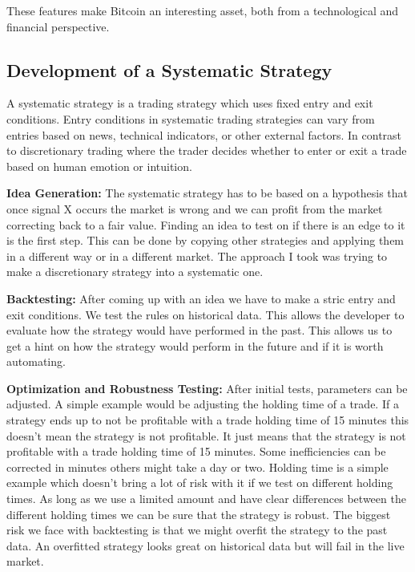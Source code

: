\documentclass[12pt]{article}
\begin{document}
These features make Bitcoin an interesting asset, both from a technological and financial perspective.









\newpage




\subsection*{Development of a Systematic Strategy}


A systematic strategy is a trading strategy which uses fixed entry and exit conditions. Entry conditions in systematic trading strategies can vary from entries based on news, technical indicators, or other external factors. In contrast to discretionary trading where the trader decides whether to enter or exit a trade based on human emotion or intuition.

\textbf{Idea Generation:}
The systematic strategy has to be based on a hypothesis that once signal X occurs the market is wrong and we can profit from the market correcting back to a fair value. Finding an idea to test on if there is an edge to it is the first step. This can be done by copying other strategies and applying them in a different way or in a different market. The approach I took was trying to make a discretionary strategy into a systematic one.



\textbf{Backtesting:}
After coming up with an idea we have to make a stric entry and exit conditions. We test the rules on historical data. This allows the developer to evaluate how the strategy would have performed in the past. This allows us to get a hint on how the strategy would perform in the future and if it is worth automating. 

\textbf{Optimization and Robustness Testing:}
After initial tests, parameters can be adjusted. A simple example would be adjusting the holding time of a trade. If a strategy ends up to not be profitable with a trade holding time of 15 minutes this doesn't mean the strategy is not profitable. It just means that the strategy is not profitable with a trade holding time of 15 minutes. Some inefficiencies can be corrected in minutes others might take a day or two. Holding time is a simple example which doesn't bring a lot of risk with it if we test on different holding times. As long as we use a limited amount and have clear differences between the different holding times we can be sure that the strategy is robust. The biggest risk we face with backtesting is that we might overfit the strategy to the past data. An overfitted strategy looks great on historical data but will fail in the live market.
\end{document}
